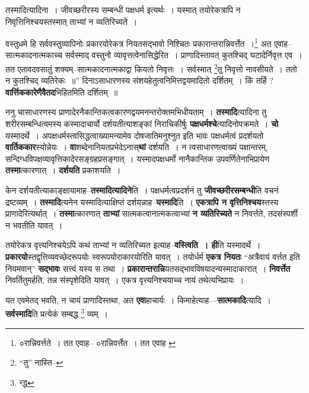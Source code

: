\documentclass[article,12pt,a4paper]{memoir}
\begin{document}
	तस्मादित्यादिना । जीवच्छरीरस्य सम्बन्धी पक्षधर्म इत्यर्थः । यस्मात् तयोरेकत्रापि न निवृत्तिनिश्चयस्तस्मात् ताभ्यां न व्यतिरिच्यते । 
	  
	वस्तुधमे हि सर्ववस्तुव्यापिनोः प्रकारयोरेकत्र नियतसद्भावो निश्चितः प्रकारान्तरान्निवर्त्तेत ।\footnote{०रान्निवर्त्तते । तत एवाह--\cite{dp-msD} ०रान्निवर्त्तेत । तत एवाह \cite{dp-msC} \cite{dp-msA} \cite{dp-msB} \cite{dp-edP} \cite{dp-edH} \cite{dp-edE} \cite{dp-edN}} अत एवाह--सात्मकादनात्मकाच्च सर्वस्माद् वस्तुनो व्यावृत्तत्वेनासिद्धेरित । प्राणादिस्तावत् कुतश्चिद् घटादेर्निवृत्त एव । तत एतावदवसातुं शक्यम्--सात्मकादनात्मकाद्वा कियतो निवृत्तः । सर्वस्मात् \footnote{“तु” नास्ति--\cite{dp-msC}}तु निवृत्तो नावसीयते । ततो न कुतश्चिद् व्यतिरेकः ॥” दिनाऽसाधारणस्य संशयहेतुत्वनिमित्तद्वयमादितो दर्शितम् । किं तर्हि ? \textbf{वार्त्तिककारेणैवैतद}भिहितमिति दर्शितम् ॥
	\pend
      

	  \pstart ननु चासाधारणस्य प्राणादेरनैकान्तिकत्वकारणद्वयमनन्तरोक्तमभिधीयताम् । \textbf{तस्मादि}त्यादिना तु शरीरसम्बन्धित्वमस्य कस्मादाचार्यो दर्शयतीत्याशङ्कां निराचिकीर्षुः \textbf{पक्षधर्मश्चे}त्यादिनोपक्रमते । \textbf{चो} यस्मादर्थे । अपक्षधर्मस्त्वसिद्धत्वाख्यामन्यामेव दोषजातिमनुश्नुत इति भावः पक्षधर्मत्वं प्रदर्शयतो \textbf{वार्तिककार}स्योन्नेयः । \textbf{वा}शब्देनानियतप्रभेदेऽनास्\textbf{थां} दर्शयति । न त्वसाधारणत्वाख्यं पक्षान्तरम्, सन्दिग्धविपक्षव्यावृत्तिकादेरसङ्ग्रहप्रसङ्गात् । यस्मादपक्षधर्मो नानैकान्तिक उपवर्णितेनाभिप्रायेण \textbf{तस्मा}त्कारणात् । \textbf{दर्शयति} प्रकाशयति ।
	\pend
      

	  \pstart केन दर्शयतीत्याकाङ्क्षायामाह--\textbf{तस्मादित्यादिने}ति । पक्षधर्मत्वप्रदर्शनं तु \textbf{जीवच्छरीरसम्बन्धी}ति वचनं द्रष्टव्यम् । \textbf{तस्मादि}त्यनेन यस्मादित्याक्षिप्तं दर्शयन्नाह--\textbf{यस्मादि}ति । \textbf{एकत्रापि न वृत्तिनिश्चय}स्तस्य प्राणादेरित्यर्थात् । \textbf{तस्मा}त्कारणात् \textbf{ताभ्यां} सात्मकत्वानात्मकत्वाभ्यां \textbf{न व्यतिरिच्यते} न निवर्त्तते, तदसंस्पर्शी न भवतीति यावत् ।
	\pend
      

	  \pstart तयोरेकत्र वृत्त्यनिश्चयेऽपि कथं ताभ्यां न व्यतिरिच्यत इत्याह--\textbf{वस्त्विति । ही}ति यस्मादर्थे । \textbf{प्रकारयो}स्तद्वृत्तिव्यवच्छेदरूपयोः स्वरूपयोराकारयोरिति यावत् । तयोर्धर्म \textbf{एकत्र नियतः} “अत्रैवायं वर्त्तत इति नियमवान्” \textbf{सद्भावः} सत्त्वं यस्य स तथा । \textbf{प्रकारान्तरान्नि}यतसद्भावविषयादन्यस्मादाकारात् । \textbf{निवर्त्तेत} निवर्तितुमर्हति, तन्न संस्पृशेदिति यावत् । एकत्र वृत्त्यनिश्चयाच्च नायं तथेत्यभिप्रायः ।
	\pend
      

	  \pstart यत एवमेतद् भवति, न चायं प्राणादिस्तथा, अत \textbf{एवा}हाचार्यः । किमाहेत्याह—\textbf{सात्मकादि}त्यादि । \textbf{सर्वस्मादि}ति प्रत्येकं सम्बद्ध \footnote{न्द्ध} व्यम् ।
	\pend
      \leavevmode{}
	  \bigskip
	  \begingroup
	
\end{document}
